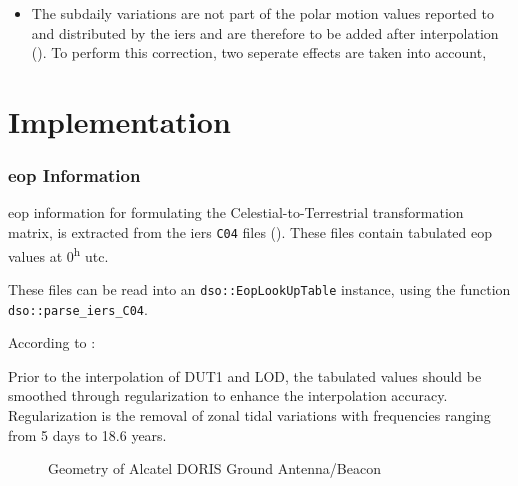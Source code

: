 \begin{itemize}
    \item The subdaily variations are not part of the polar motion values 
    reported to and distributed by the \gls{iers} and are therefore to be 
    added after interpolation (\cite{iers2010}). To perform this correction, 
    two seperate effects are taken into account,
\end{itemize}

\section{Implementation}
\label{eop-implementation}

\subsubsection{\gls{eop} Information}
\Gls{eop} information for formulating the Celestial-to-Terrestrial transformation 
matrix, is extracted from the \gls{iers} \texttt{C04} files (\cite{Bizouard2019}).
These files contain tabulated \gls{eop} values at 0\textsuperscript{h} \gls{utc}. 

These files can be read into an \texttt{dso::EopLookUpTable} instance, using 
the function \texttt{dso::parse\_iers\_C04}.

According to \cite{Bradley2016850}:
\begin{displayquote}
    Prior to the interpolation of DUT1 and LOD, the tabulated values
    should be smoothed through regularization to enhance the
    interpolation accuracy. Regularization is the removal of
    zonal tidal variations with frequencies ranging from 5 days
    to 18.6 years.
\end{displayquote}


\begin{figure}
\centering

\caption{Geometry of Alcatel DORIS Ground Antenna/Beacon}
\label{fig:alcatel-antenna}
\end{figure}